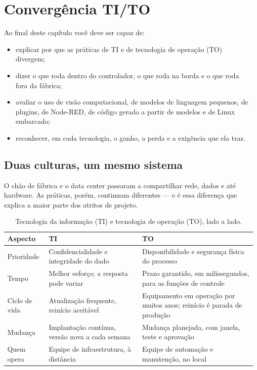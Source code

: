 \chapter{Convergência TI/TO}
\label{cap:ti-to}

\begin{objetivos}
Ao final deste capítulo você deve ser capaz de:
\begin{itemize}
  \item explicar por que as práticas de TI e de tecnologia de operação (TO) divergem;
  \item dizer o que roda dentro do controlador, o que roda na borda e o que roda fora da fábrica;
  \item avaliar o uso de visão computacional, de modelos de linguagem pequenos, de plugins, de
        Node-RED, de código gerado a partir de modelos e de Linux embarcado;
  \item reconhecer, em cada tecnologia, o ganho, a perda e a exigência que ela traz.
\end{itemize}
\end{objetivos}

\section{Duas culturas, um mesmo sistema}

O chão de fábrica e o data center passaram a compartilhar rede, dados e até hardware. As práticas,
porém, continuam diferentes --- e é essa diferença que explica a maior parte dos atritos de projeto.

\begin{table}[H]
  \centering
  \caption{Tecnologia da informação (TI) e tecnologia de operação (TO), lado a lado.}
  \label{tab:ti-versus-to}
  \begin{tabular}{p{3.0cm} p{5.4cm} p{5.8cm}}
    \toprule
    Aspecto & TI & TO \\
    \midrule
    Prioridade
      & Confidencialidade e integridade do dado
      & Disponibilidade e segurança física do processo \\
    \addlinespace
    Tempo
      & Melhor esforço; a resposta pode variar
      & Prazo garantido, em milissegundos, para as funções de controle \\
    \addlinespace
    Ciclo de vida
      & Atualização frequente, reinício aceitável
      & Equipamento em operação por muitos anos; reinício é parada de produção \\
    \addlinespace
    Mudança
      & Implantação contínua, versão nova a cada semana
      & Mudança planejada, com janela, teste e aprovação \\
    \addlinespace
    Quem opera
      & Equipe de infraestrutura, à distância
      & Equipe de automação e manutenção, no local \\
    \bottomrule
  \end{tabular}
\end{table}

